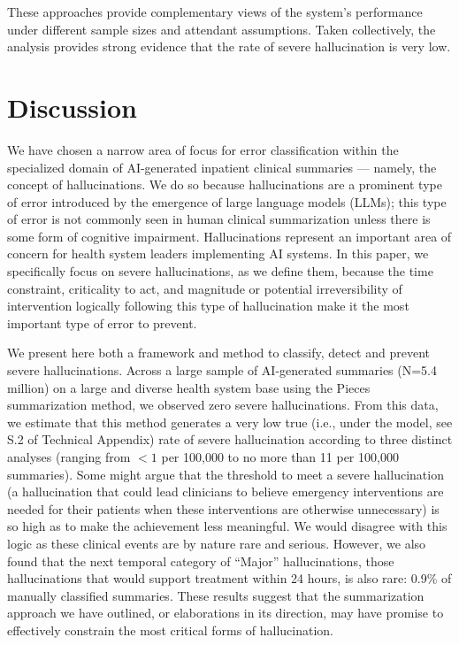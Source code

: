 \documentclass{style/myclass}
\begin{document}
These approaches provide complementary views of the system’s performance under different sample sizes and attendant assumptions. Taken collectively, the analysis provides strong evidence that the rate of severe hallucination is very low.

\section{Discussion}

We have chosen a narrow area of focus for error classification within the specialized domain of AI-generated inpatient clinical summaries — namely, the concept of hallucinations. We do so because hallucinations are a prominent type of error introduced by the emergence of large language models (LLMs); this type of error is not commonly seen in human clinical summarization unless there is some form of cognitive impairment. Hallucinations represent an important area of concern for health system leaders implementing AI systems. \cite{4} In this paper, we specifically focus on severe hallucinations, as we define them, because the time constraint, criticality to act, and magnitude or potential irreversibility of intervention logically following this type of hallucination make it the most important type of error to prevent.

We present here both a framework and method to classify, detect and prevent severe hallucinations. Across a large sample of AI-generated summaries (N=5.4 million) on a large and diverse health system base using the Pieces summarization method, we observed zero severe hallucinations. From this data, we estimate that this method generates a very low true (i.e., under the model, see S.2 of Technical Appendix) rate of severe hallucination according to three distinct analyses (ranging from $<1$ per 100,000 to no more than 11 per 100,000 summaries). Some might argue that the threshold to meet a severe hallucination (a hallucination that could lead clinicians to believe emergency interventions are needed for their patients when these interventions are otherwise unnecessary) is so high as to make the achievement less meaningful. We would disagree with this logic as these clinical events are by nature rare and serious. However, we also found that the next temporal category of “Major” hallucinations, those hallucinations that would support treatment within 24 hours, is also rare: 0.9\% of manually classified summaries. These results suggest that the summarization approach we have outlined, or elaborations in its direction, may have promise to effectively constrain the most critical forms of hallucination.
\end{document}
